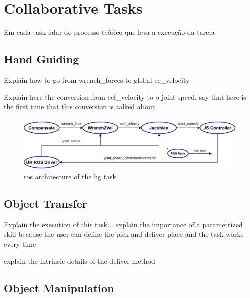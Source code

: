 \chapter{Collaborative Tasks}
\label{chapter:colab-tasks}

\par Em cada task falar do processo teórico que leva a execução da tarefa 

\section{Hand Guiding}

\par Explain how to go from wrench\_forces to global ee\_velocity

\par Explain here the conversion from eef\_velocity to o joint speed. say that here is the first time that this conversion is talked about 


\begin{figure}[h]
    \centering
    \includegraphics[width=\linewidth]{figs/chp4/ros_hg_arch.pdf}
    \caption{\ac{ros} architecture of the \ac{hg} task}
    \label{fig:ros_hg_arch}
\end{figure}

\section{Object Transfer}

\par Explain the execution of this task... explain the importance of a parametrized skill because the user can define the pick and deliver place and the task works every time
\par explain the intrinsic details of the deliver method

\section{Object Manipulation}

